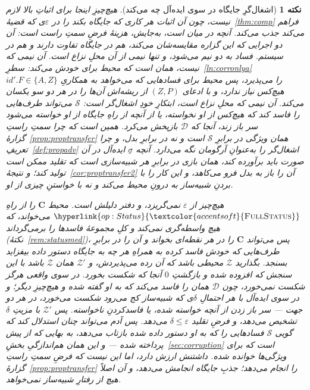\documentclass[10pt,oneside,openany]{book}
\newcommand{\Cs}{\mathbf{C}}
\newcommand{\Zenv}{\mathcal{Z}}
\newcommand{\Dum}{\mathcal{D}}
\newcommand{\Sim}{\mathcal{S}}
\newcommand{\op}[1]{\textnormal{\textsc{#1}}}
\newcommand{\fopl}[1]{\hyperlink{op:#1}{\textcolor{accentsoft}{\op{Full}\op{#1}}}}
\newcommand{\id}{id}
\theoremstyle{accentdef}
\newtheorem{remark}[definition]{نکته}
\theoremstyle{accentplain}
\begin{document}
\begin{remark}[اشغال‌گرِ جایگاه در سوی ایده‌آل چه می‌کند]\label{rem:propslot}
هیچ‌چیزِ اینجا برای اثباتِ بالا لازم نیست، چون آن اثبات هر کاری که جایگاه
بکند را در $\varepsilon$ی که قضیهٔ~\ref{thm:comp} فراهم می‌کند جذب می‌کند.
آنچه در میان است، به‌جایش، هزینهٔ \emph{فرضِ} سمتِ راست است: آن دو اجرایی که
این گزاره مقایسه‌شان می‌کند، هم در جایگاه تفاوت دارند و هم در سیستم. فساد
به دو نیم می‌شود، و تنها نیمی از آن محلِ نزاع است. آن نیمی که نیست، همان
است که محیط برای خودش می‌کند: سطرِ~\ref{ln:corronlya} $\id'.F \in \{A,Z\}$
را می‌پذیرد، پس محیط برای فسادهایی که می‌خواهد به همکاریِ هیچ‌کس نیاز
ندارد، و با ادعای $(Z,P)$ از ریشه‌اش آن‌ها را در هر دو سو یکسان می‌کند. آن
نیمی که محلِ نزاع است، ابتکارِ خودِ اشغال‌گر است: $\Sim$ می‌تواند طرف‌هایی
را فاسد کند که هیچ‌کس از او نخواسته، یا از آنچه از راهِ جایگاه از او
خواسته می‌شود سر باز زند، آنجا که $\Dum$ بازپخش می‌کرد. همین است که چرا
سمتِ راستِ گزارهٔ~\ref{prop:proptransfer} همان ویژگی در برابرِ $\Sim$ است و
نه در برابرِ بدل، و چرا تعریفِ~\ref{def:propadv} اشغال‌گر را به‌عنوانِ
آرگومان نگه می‌دارد. آنچه $\sigma$ِ ایده‌آل \emph{در آن صورت} باید
برآورده کند، همان بازی در برابرِ هر شبیه‌سازی است که تقلید ممکن است تولید
کند؛ و نتیجهٔ~\ref{cor:proptransfer2} آن را باز به بدل فرو می‌کاهد، و این
کار را با بردنِ شبیه‌ساز به درونِ محیط می‌کند و نه با خواستنِ چیزی از او.

هیچ‌چیز از $\varepsilon$ نمی‌گریزد، و دفتر دلیلش است. محیط $\Cs$ را از
راهِ $\fopl{Status}$ می‌خواند، که هیچ واسطه‌گری نمی‌کند و کلِ مجموعهٔ
فاسدها را برمی‌گرداند (نکتهٔ~\ref{rem:statusmed})، پس می‌تواند $\Cs$ را در
هر نقطه‌ای بخواند و آن را در برابرِ طرف‌هایی که خودش فاسد کرده به همراهِ هر
چه به جایگاه دستور داده بیفزاید بسنجد. بگذارید $\Zenv$ محیطی باشد که آن
رده می‌پذیردش، و $\Zenv'$ همان $\Zenv$ باشد با این سنجش که افزوده شده و
بازگشتِ $0$ آنجا که شکست بخورد. در سوی واقعی هرگز شکست نمی‌خورد، چون
$\Dum$ همان را فاسد می‌کند که به او گفته شده و هیچ‌چیزِ دیگر؛ و در سوی
ایده‌آل با هر احتمالِ $\delta$ی که شبیه‌ساز کج می‌رود شکست می‌خورد، در هر
دو جهت --- سر باز زدن از آنچه خواسته شده، یا فاسدکردنِ ناخواسته. پس
$\Zenv'$ با مزیتِ $\delta$ تشخیص می‌دهد، و فرضِ تقلید $\delta \leq
\varepsilon$ می‌دهد. پس آدم می‌تواند چنان استدلال کند که گویی $\Sim$
فسادهایی را که به او دستور داده شده بازتاب می‌دهد، به بهایی که از پیش
پرداخته شده --- و این همان هم‌اندازگیِ بخشِ~\ref{sec:corruption} است که
برای ویژگی‌ها خوانده شده. داشتنش ارزش دارد، اما این نیست که فرضِ سمتِ
راستِ گزارهٔ~\ref{prop:proptransfer} را انجام می‌دهد؛ جذبِ جایگاه انجامش
می‌دهد، و آن اصلاً هیچ از رفتارِ شبیه‌ساز نمی‌خواهد.
\end{remark}
\end{document}
